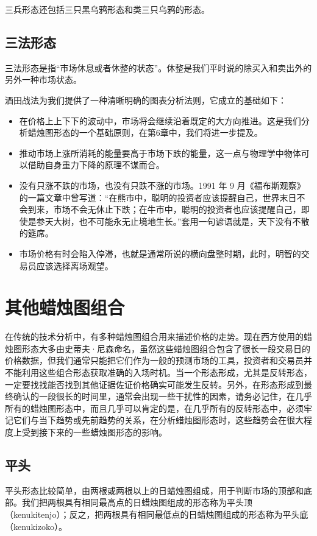 三兵形态还包括三只黑乌鸦形态和类三只乌鸦的形态。
\subsection{三法形态}
三法形态是指“市场休息或者休整的状态”。休整是我们平时说的除买入和卖出外的另外一种市场状态。

酒田战法为我们提供了一种清晰明确的图表分析法则，它成立的基础如下：
\begin{itemize}
    \item 在价格上上下下的波动中，市场将会继续沿着既定的大方向推进。这是我们分析蜡烛图形态的一个基础原则，在第6章中，我们将进一步提及。
    \item 推动市场上涨所消耗的能量要高于市场下跌的能量，这一点与物理学中物体可以借助自身重力下降的原理不谋而合。
    \item 没有只涨不跌的市场，也没有只跌不涨的市场。1991 年 9 月《福布斯观察》的一篇文章中曾写道：“在熊市中，聪明的投资者应该提醒自己，世界末日不会到来，市场不会无休止下跌；在牛市中，聪明的投资者也应该提醒自己，即使是参天大树，也不可能永无止境地生长。”套用一句谚语就是，天下没有不散的筵席。
    \item 市场价格有时会陷入停滞，也就是通常所说的横向盘整时期，此时，明智的交易员应该选择离场观望。
\end{itemize}
\section{其他蜡烛图组合}
在传统的技术分析中，有多种蜡烛图组合用来描述价格的走势。现在西方使用的蜡烛图形态大多由史蒂夫·尼森命名，虽然这些蜡烛图组合包含了很长一段交易日的价格数据，但我们通常只能把它们作为一般的预测市场的工具，投资者和交易员并不能利用这些组合形态获取准确的入场时机。当一个形态形成，尤其是反转形态，一定要找找能否找到其他证据佐证价格确实可能发生反转。另外，在形态形成到最终确认的一段很长的时间里，通常会出现一些干扰性的因素，请务必记住，在几乎所有的蜡烛图形态中，而且几乎可以肯定的是，在几乎所有的反转形态中，必须牢记它们与当下趋势或先前趋势的关系，在分析蜡烛图形态时，这些趋势会在很大程度上受到接下来的一些蜡烛图形态的影响。
\subsection{平头}
平头形态比较简单，由两根或两根以上的日蜡烛图组成，用于判断市场的顶部和底部。我们把两根具有相同最高点的日蜡烛图组成的形态称为平头顶（kenukitenjo）；反之，把两根具有相同最低点的日蜡烛图组成的形态称为平头底（kenukizoko）。

